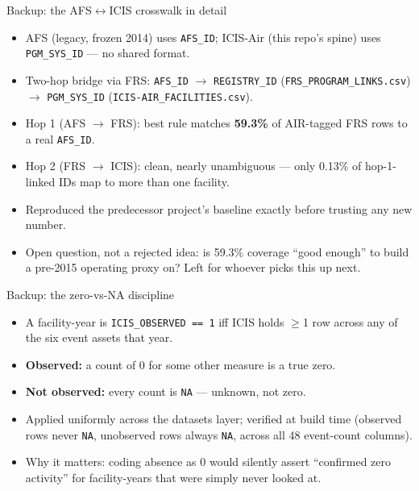 \documentclass[aspectratio=169,11pt]{beamer}
\begin{document}
\appendix
\begin{frame}{Backup: the AFS$\leftrightarrow$ICIS crosswalk in detail}
  \begin{itemize}
    \item AFS (legacy, frozen 2014) uses \texttt{AFS\_ID}; ICIS-Air (this repo's spine) uses
      \texttt{PGM\_SYS\_ID} — no shared format.
    \item Two-hop bridge via FRS: \texttt{AFS\_ID} $\to$ \texttt{REGISTRY\_ID}
      (\texttt{FRS\_PROGRAM\_LINKS.csv}) $\to$ \texttt{PGM\_SYS\_ID} (\texttt{ICIS-AIR\_FACILITIES.csv}).
    \item Hop 1 (AFS $\to$ FRS): best rule matches \textbf{59.3\%} of AIR-tagged FRS rows to a real
      \texttt{AFS\_ID}.
    \item Hop 2 (FRS $\to$ ICIS): clean, nearly unambiguous — only 0.13\% of hop-1-linked IDs map to more
      than one facility.
    \item Reproduced the predecessor project's baseline exactly before trusting any new number.
    \item Open question, not a rejected idea: is 59.3\% coverage ``good enough'' to build a pre-2015
      operating proxy on? Left for whoever picks this up next.
  \end{itemize}
\end{frame}

\begin{frame}{Backup: the zero-vs-NA discipline}
  \begin{itemize}
    \item A facility-year is \texttt{ICIS\_OBSERVED == 1} iff ICIS holds $\geq$1 row across any of the six
      event assets that year.
    \item \textbf{Observed:} a count of 0 for some other measure is a true zero.
    \item \textbf{Not observed:} every count is \texttt{NA} — unknown, not zero.
    \item Applied uniformly across the datasets layer; verified at build time (observed rows never
      \texttt{NA}, unobserved rows always \texttt{NA}, across all 48 event-count columns).
    \item Why it matters: coding absence as 0 would silently assert ``confirmed zero activity'' for
      facility-years that were simply never looked at.
  \end{itemize}
\end{frame}
\end{document}
